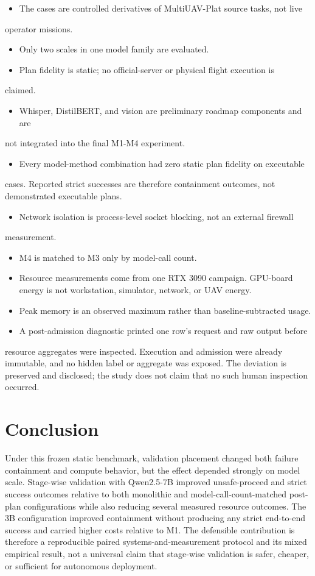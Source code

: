 \documentclass[conference]{IEEEtran}
\begin{document}
\begin{itemize}
\item The cases are controlled derivatives of MultiUAV-Plat source tasks, not live
\end{itemize}
operator missions.
\begin{itemize}
\item Only two scales in one model family are evaluated.
\item Plan fidelity is static; no official-server or physical flight execution is
\end{itemize}
claimed.
\begin{itemize}
\item Whisper, DistilBERT, and vision are preliminary roadmap components and are
\end{itemize}
not integrated into the final M1-M4 experiment.
\begin{itemize}
\item Every model-method combination had zero static plan fidelity on executable
\end{itemize}
cases. Reported strict successes are therefore containment outcomes, not
demonstrated executable plans.
\begin{itemize}
\item Network isolation is process-level socket blocking, not an external firewall
\end{itemize}
measurement.
\begin{itemize}
\item M4 is matched to M3 only by model-call count.
\item Resource measurements come from one RTX 3090 campaign. GPU-board energy is not workstation, simulator, network, or UAV energy.
\item Peak memory is an observed maximum rather than baseline-subtracted usage.
\item A post-admission diagnostic printed one row's request and raw output before
\end{itemize}
resource aggregates were inspected. Execution and admission were already
immutable, and no hidden label or aggregate was exposed. The deviation is
preserved and disclosed; the study does not claim that no such human
inspection occurred.

\section{Conclusion}

Under this frozen static benchmark, validation placement changed both failure
containment and compute behavior, but the effect depended strongly on model
scale. Stage-wise validation with Qwen2.5-7B improved unsafe-proceed and strict
success outcomes relative to both monolithic and model-call-count-matched post-plan
configurations while also reducing several measured resource outcomes. The 3B
configuration improved containment without producing any strict end-to-end
success and carried higher costs relative to M1. The defensible contribution
is therefore a reproducible paired systems-and-measurement protocol and its
mixed empirical result, not a universal claim that stage-wise validation is
safer, cheaper, or sufficient for autonomous deployment.
\end{document}
